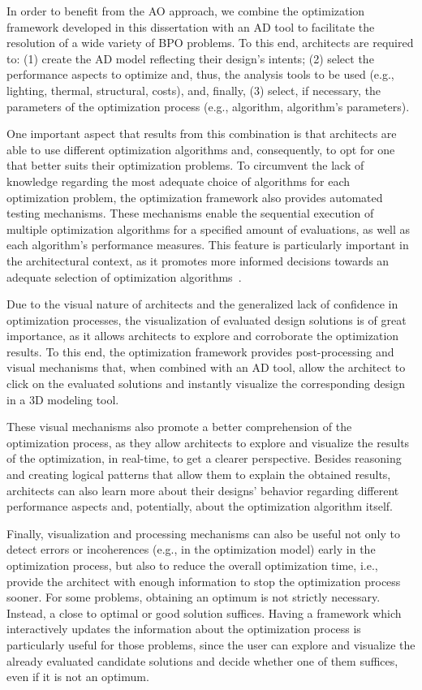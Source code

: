 In order to benefit from the \ac{AO} approach, we combine the optimization framework developed in this dissertation with an \ac{AD} tool to facilitate the resolution of a wide variety of \ac{BPO} problems. To this end, architects are required to: (1) create the \ac{AD} model reflecting their design's intents; (2) select the performance aspects to optimize and, thus, the analysis tools to be used (e.g., lighting, thermal, structural, costs), and, finally, (3) select, if necessary, the parameters of the optimization process (e.g., algorithm, algorithm's parameters).

One important aspect that results from this combination is that architects are able to use different optimization algorithms and, consequently, to opt for one that better suits their optimization problems. To circumvent the lack of knowledge regarding the most adequate choice of algorithms for each optimization problem, the optimization framework also provides automated testing mechanisms. These mechanisms enable the sequential execution of multiple optimization algorithms for a specified amount of evaluations, as well as each algorithm's performance measures. This feature is particularly important in the architectural context, as it promotes more informed decisions towards an adequate selection of optimization algorithms~\cite{Wortmann2016BBO,Hamdy2016}.

Due to the visual nature of architects and the generalized lack of confidence in optimization processes, the visualization of evaluated design solutions is of great importance, as it allows architects to explore and corroborate the optimization results. To this end, the optimization framework provides post-processing and visual mechanisms that, when combined with an \ac{AD} tool, allow the architect to click on the evaluated solutions and instantly visualize the corresponding design in a 3D modeling tool. 

These visual mechanisms also promote a better comprehension of the optimization process, as they allow architects to explore and visualize the results of the optimization, in real-time, to get a clearer perspective. Besides reasoning and creating logical patterns that allow them to explain the obtained results, architects can also learn more about their designs' behavior regarding different performance aspects and, potentially, about the optimization algorithm itself.

Finally, visualization and processing mechanisms can also be useful not only to detect errors or incoherences (e.g., in the optimization model) early in the optimization process, but also to reduce the overall optimization time, i.e.,  provide the architect with enough information to stop the optimization process sooner. For some problems, obtaining an optimum is not strictly necessary. Instead, a close to optimal or good solution suffices. Having a framework which interactively updates the information about the optimization process is particularly useful for those problems, since the user can explore and visualize the already evaluated candidate solutions and decide whether one of them suffices, even if it is not an optimum. 
